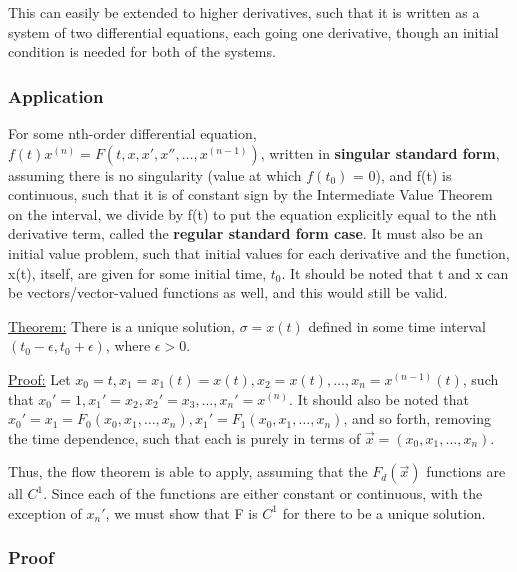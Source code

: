 \documentclass[11 pt, twoside]{article}
\begin{document}
This can easily be extended to higher derivatives, such that it is written as a system of two differential equations, each going one derivative, though an initial condition is needed for both of the systems.

\subsubsection{Application}
For some nth-order differential equation, $f(t)x^{(n)} = F(t, x, x', x'', \dots, x^{(n-1)})$, written in \textbf{singular standard form}, assuming there is no singularity (value at which $f(t_0)$ = 0), and f(t) is continuous, such that it is of constant sign by the Intermediate Value Theorem on the interval, we divide by f(t) to put the equation explicitly equal to the nth derivative term, called the \textbf{regular standard form case}. It must also be an initial value problem, such that initial values for each derivative and the function, x(t), itself, are given for some initial time, $t_0$. It should be noted that t and x can be vectors/vector-valued functions as well, and this would still be valid.

\underline{Theorem:} There is a unique solution, $\sigma = x(t)$ defined in some time interval $(t_0 - \epsilon, t_0 + \epsilon)$, where $\epsilon > 0$.

\underline{Proof:}
Let $x_0 = t, x_1 = x_1(t) = x(t), x_2 = x(t), \dots, x_n = x^{(n-1)}(t)$, such that $x_0' = 1, x_1' = x_2, x_2' = x_3, \dots, x_n' = x^{(n)}$. It should also be noted that $x_0' = x_1 = F_0(x_0, x_1, \dots, x_n), x_1' = F_1(x_0, x_1, \dots, x_n)$, and so forth, removing the time dependence, such that each is purely in terms of $\vec{x} = (x_0, x_1, \dots, x_n)$. 

Thus, the flow theorem is able to apply, assuming that the $F_d(\vec{x})$ functions are all $C^1$. Since each of the functions are either constant or continuous, with the exception of $x_n'$, we must show that F is $C^1$ for there to be a unique solution.

\subsubsection{Proof}
\end{document}
